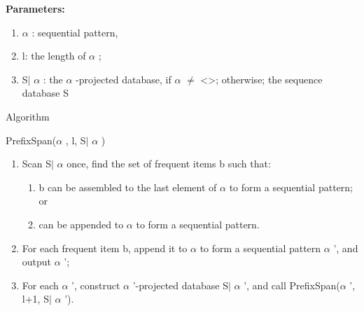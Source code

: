 \documentclass[12pt]{article}
\renewcommand{\_}{\kern-1.5pt\textunderscore\kern-1.5pt}
\begin{document}
\textbf{Parameters: }\par

\begin{enumerate}
	\item $ \alpha $ : sequential pattern, \par

	\item l: the length of $ \alpha $ ; \par

	\item S$ \vert $ $ \alpha $ : the $ \alpha $ -projected database, if $ \alpha $  $ \neq $ <>; otherwise; the sequence database S
\end{enumerate}\par

Algorithm\par

PrefixSpan($ \alpha $ , l, S$ \vert $ $ \alpha $ )\par

\begin{enumerate}
	\item Scan S$ \vert $ $ \alpha $  once, find the set of frequent items b such that: \par

\begin{enumerate}
	\item b can be assembled to the last element of $ \alpha $  to form a sequential pattern; or \par

	\item can be appended to $ \alpha $  to form a sequential pattern.\par


\end{enumerate}
	\item For each frequent item b, append it to $ \alpha $  to form a sequential pattern $ \alpha $ ’, and output $ \alpha $ ’;\par

	\item For each $ \alpha $ ’, construct $ \alpha $ ’-projected database S$ \vert $ $ \alpha $ ’, and call PrefixSpan($ \alpha $ ’, l+1, S$ \vert $ $ \alpha $ ’).
\end{enumerate}\par


\par
\end{document}
